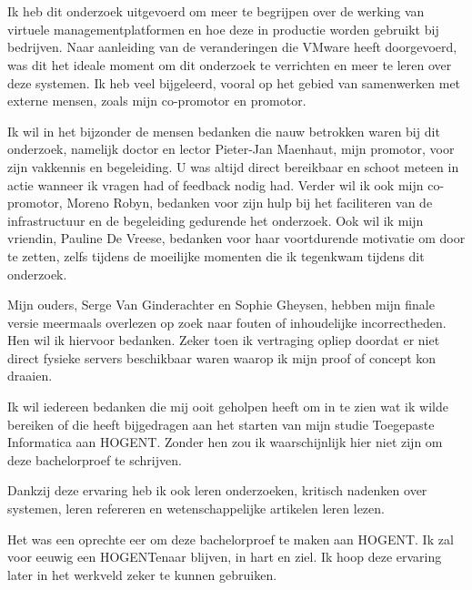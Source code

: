 
\chapter*{}%
\label{ch:voorwoord}




Ik heb dit onderzoek uitgevoerd om meer te begrijpen over de werking van virtuele managementplatformen en hoe deze in productie worden gebruikt bij bedrijven.
Naar aanleiding van de veranderingen die VMware heeft doorgevoerd, was dit het ideale moment om dit onderzoek te verrichten en meer te leren over deze systemen.
Ik heb veel bijgeleerd, vooral op het gebied van samenwerken met externe mensen, zoals mijn co-promotor en promotor.

Ik wil in het bijzonder de mensen bedanken die nauw betrokken waren bij dit onderzoek, namelijk doctor en lector Pieter-Jan Maenhaut, mijn promotor, voor zijn vakkennis en begeleiding. U was altijd direct bereikbaar en schoot meteen in actie wanneer ik vragen had of feedback nodig had.
Verder wil ik ook mijn co-promotor, Moreno Robyn, bedanken voor zijn hulp bij het faciliteren van de infrastructuur en de begeleiding gedurende het onderzoek.
Ook wil ik mijn vriendin, Pauline De Vreese, bedanken voor haar voortdurende motivatie om door te zetten, zelfs tijdens de moeilijke momenten die ik tegenkwam tijdens dit onderzoek.

Mijn ouders, Serge Van Ginderachter en Sophie Gheysen, hebben mijn finale versie meermaals overlezen op zoek naar fouten of inhoudelijke incorrectheden. Hen wil ik hiervoor bedanken.
Zeker toen ik vertraging opliep doordat er niet direct fysieke servers beschikbaar waren waarop ik mijn proof of concept kon draaien.

Ik wil iedereen bedanken die mij ooit geholpen heeft om in te zien wat ik wilde bereiken of die heeft bijgedragen aan het starten van mijn studie Toegepaste Informatica aan HOGENT. Zonder hen zou ik waarschijnlijk hier niet zijn om deze bachelorproef te schrijven.

Dankzij deze ervaring heb ik ook leren onderzoeken, kritisch nadenken over systemen, leren refereren en wetenschappelijke artikelen leren lezen.

Het was een oprechte eer om deze bachelorproef te maken aan HOGENT. Ik zal voor eeuwig een HOGENTenaar blijven, in hart en ziel.
Ik hoop deze ervaring later in het werkveld zeker te kunnen gebruiken.